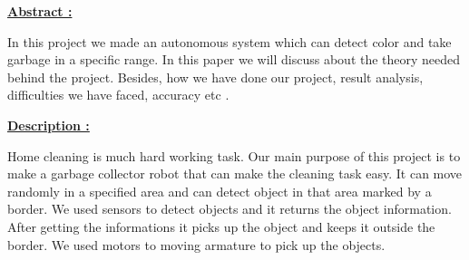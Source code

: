 \documentclass[12pt]{article}
\begin{document}
\vspace{\baselineskip}

\vspace{\baselineskip}

\vspace{\baselineskip}

\vspace{\baselineskip}

\vspace{\baselineskip}

\vspace{\baselineskip}

\vspace{\baselineskip}

\vspace{\baselineskip}

\vspace{\baselineskip}

\vspace{\baselineskip}

\vspace{\baselineskip}
{\fontsize{18pt}{21.6pt}\selectfont \textbf{\uline{Abstract :}}\par}\par

{\fontsize{14pt}{16.8pt}\selectfont In this project we made an autonomous system which can detect color and take garbage in a specific range. In this paper we will discuss about the theory needed behind the project. Besides, how we have done our project, result analysis, difficulties we have faced, accuracy etc . \par}\par

{\fontsize{18pt}{21.6pt}\selectfont \textbf{\uline{Description :}}\par}\par

{\fontsize{14pt}{16.8pt}\selectfont Home cleaning is much hard working task. Our main purpose of this project is to make a garbage collector robot that can make the cleaning task easy. It can move randomly in a specified area and can detect object in that area marked by a border. We used sensors to detect objects and it returns the object information. After getting the informations it picks up the object and keeps it outside the border. We used motors to moving armature to pick up the objects.\par}\par
\end{document}
